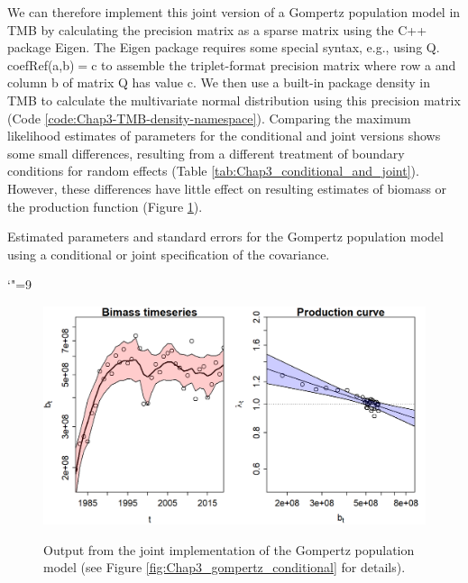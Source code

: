 We can therefore implement this joint version of a Gompertz population model in TMB by calculating the precision matrix as a sparse matrix using the C++ package \colorbox{backblue}{Eigen}.  The \colorbox{backblue}{Eigen} package requires some special syntax, e.g., using \colorbox{backblue}{Q$.$coefRef(a,b)$=$c} to assemble the triplet-format precision matrix where row \colorbox{backblue}{a} and column \colorbox{backblue}{b} of matrix \colorbox{backblue}{Q} has value \colorbox{backblue}{c}.  We then use a built-in package \colorbox{backblue}{density} in TMB to calculate the multivariate normal distribution using this precision matrix (Code \ref{code:Chap3-TMB-density-namespace}). Comparing the maximum likelihood estimates of parameters for the conditional and joint versions shows some small differences, resulting from a different treatment of boundary conditions for random effects (Table \ref{tab:Chap3_conditional_and_joint}).  However, these differences have little effect on resulting estimates of biomass or the production function (Figure \ref{fig:Chap3_gompertz_simultaneous}).

\begin{table}
  \caption[Comparing estimates between conditional and joint covariance models]{Estimated parameters and standard errors for the Gompertz population model using a conditional or joint specification of the covariance.}
  \catcode`"=9
  \centering
  \label{tab:Chap3_conditional_and_joint}
\end{table}

\begin{figure}[!ht]
    \caption[Biomass estimated using simultaneous covariance for model]{Output from the joint implementation of the Gompertz population model (see Figure \ref{fig:Chap3_gompertz_conditional} for details).}
    \centering
    \includegraphics[width=5.5in]{Chap_3/gompertz_fit_SAR.png}
    \label{fig:Chap3_gompertz_simultaneous}
\end{figure}

